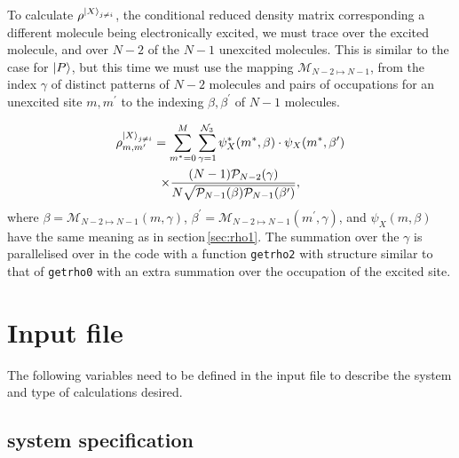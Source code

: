 \documentclass[final,twocolumn]{elsarticle}
\newcommand{\cntsetx}{\mathcal{P}_{N-1}}
\newcommand{\cntsetxx}{\mathcal{P}_{N-2}}
\newcommand{\nc}{{\mathcal{N}_{3}}}
\newcommand{\maptoNa}{{\mathcal{M}}_{N-2 \mapsto N-1}}
\begin{document}
\begin{small}
To calculate $\rho^{\ket{X}_{j \neq i}}$, the conditional reduced density
matrix corresponding a different molecule being electronically excited,
we must trace over the excited molecule, and over $N-2$ of the $N-1$
unexcited molecules.  This is similar to the case for
$\ket{P}$, but this time we must use the mapping
$\maptoNa$, from the index $\gamma$ of distinct patterns of $N-2$ 
molecules and pairs of occupations for an unexcited site $m,m^\prime$
to the indexing $\beta,\beta^\prime$ of $N-1$ molecules.

\begin{multline} 
  \rho^{\ket{X}_{j \neq i}}_{m,m'} = 
   \sum_{m^{\ast}=0}^{M}
  \sum_{\gamma=1}^{\nc}
  \psi^\ast_{X}(m^\ast, \beta) \cdot
  \psi_{X}(m^\ast, \beta^\prime)
  \\ \times
  \frac{(N-1)\cntsetxx(\gamma)}{%
    N\sqrt{\cntsetx(\beta) \cntsetx(\beta^\prime)}},
\end{multline} 
where
$\beta = \maptoNa(m, \gamma)$, $\beta^\prime = \maptoNa(m^\prime, \gamma)$,
and $\psi_{X}(m,\beta)$ have the same meaning as in section\,\ref{sec:rho1}.
The summation over the $\gamma$ is parallelised over in the code
 with a function \texttt{getrho2} with structure similar to that of \texttt{getrho0}
 with an extra summation over the occupation of the excited site.



\section{Input file}

The following variables need to be defined in the input file
to describe the system and type of calculations desired.

\subsection{system specification}

\end{small}
\end{document}

